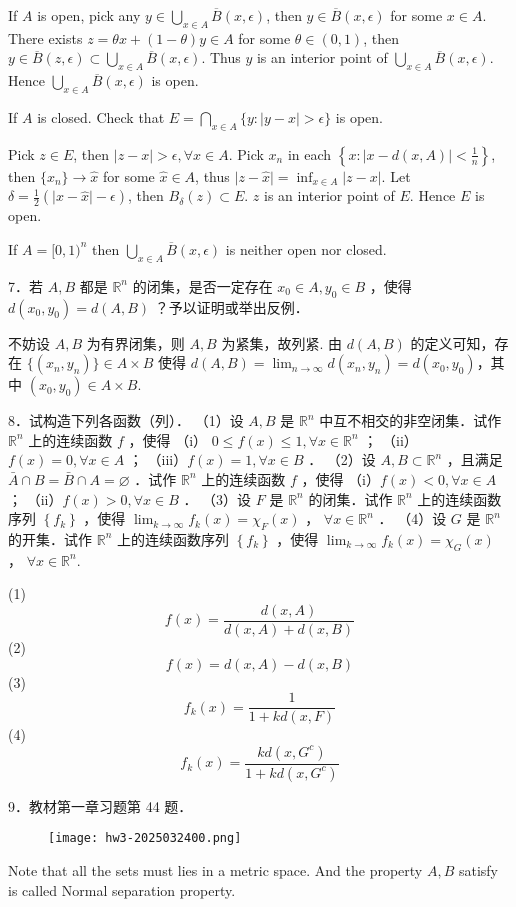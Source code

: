 If $A$ is open, pick any $y\in \bigcup_{x\in A}\overline{B}(x,\epsilon)$, then $y\in \overline{B}(x,\epsilon)$ for some $x\in A$. There exists $z=\theta x+(1-\theta) y\in A$ for some $\theta\in(0,1)$, then $y\in \overline{B}(z,\epsilon)\subset \bigcup_{x\in A}\overline{B}(x,\epsilon)$. Thus $y$ is an interior point of $\bigcup_{x\in A}\overline{B}(x,\epsilon)$. Hence $\bigcup_{x\in A}\overline{B}(x,\epsilon)$ is open.

If $A$ is closed. Check that $E=\bigcap_{x\in A}\{ y:\lvert y-x \rvert>\epsilon \}$ is open.

Pick $z\in E$, then $\lvert z-x \rvert>\epsilon,\forall x\in A$. Pick $x_n$ in each $\left\{  x:\lvert x-d(x,A) \rvert<\frac{1}{n}  \right\}$, then $\{ x_n \}\to \widehat{x}$ for some $\widehat{x}\in A$, thus $\lvert z-\widehat{x} \rvert=\inf_{x\in A}\lvert z-x \rvert$. Let $\delta=\frac{1}{2}(\lvert x-\widehat{x} \rvert-\epsilon)$, then $B_{\delta}(z)\subset E$. $z$ is an interior point of $E$. Hence $E$ is open.

If $A=[0,1)^{n}$ then $\bigcup_{x\in A}\overline{B}(x,\epsilon)$ is neither open nor closed.

\begin{exercise}
7．若 $A, B$ 都是 $\mathbb{R}^n$ 的闭集，是否一定存在 $x_0 \in A, y_0 \in B$ ，使得 $d\left(x_0, y_0\right)=d(A, B)$ ？予以证明或举出反例．
\end{exercise}
不妨设 $A,B$ 为有界闭集，则 $A,B$ 为紧集，故列紧. 由 $d(A,B)$ 的定义可知，存在 $\{ (x_n, y_n) \}\in A\times B$ 使得 $d(A,B)=\lim_{ n \to \infty }d(x_n,y_n)=d(x_0,y_0)$，其中 $(x_0, y_0)\in A\times B$.

\begin{exercise}
8．试构造下列各函数（列）．
（1）设 $A, B$ 是 $\mathbb{R}^n$ 中互不相交的非空闭集．试作 $\mathbb{R}^n$ 上的连续函数 $f$ ，使得
（i） $0 \leqslant f(x) \leqslant 1, \forall x \in \mathbb{R}^n$ ；
（ii）$f(x)=0, \forall x \in A$ ；
（iii）$f(x)=1, \forall x \in B$ ．
（2）设 $A, B \subset \mathbb{R}^n$ ，且满足 $\bar{A} \cap B=\bar{B} \cap A=\varnothing$ ．试作 $\mathbb{R}^n$ 上的连续函数 $f$ ，使得
（i）$f(x)<0, \forall x \in A$ ；
（ii）$f(x)>0, \forall x \in B$ ．
（3）设 $F$ 是 $\mathbb{R}^n$ 的闭集．试作 $\mathbb{R}^n$ 上的连续函数序列 $\left\{f_k\right\}$ ，使得 $\lim _{k \rightarrow \infty} f_k(x)=\chi_F(x)$ ， $\forall x \in \mathbb{R}^n$ ．
（4）设 $G$ 是 $\mathbb{R}^n$ 的开集．试作 $\mathbb{R}^n$ 上的连续函数序列 $\left\{f_k\right\}$ ，使得 $\lim _{k \rightarrow \infty} f_k(x)=\chi_G(x)$ ， $\forall x \in \mathbb{R}^n$.
\end{exercise}
(1)
\[
f(x)=\frac{d(x,A)}{d(x,A)+d(x,B)}
\]
(2)
\[
f(x)=d(x,A)-d(x,B)
\]
(3)
\[
f_k(x)=\frac{1}{1+kd(x,F)}
\]
(4)
\[
f_k(x)=\frac{kd(x,G^{c})}{1+kd(x,G^{c})}
\]
\begin{exercise}
9．教材第一章习题第 44 题．
\begin{figure}[H]
\centering
\texttt{[image: hw3-2025032400.png]}
\label{}
\end{figure}
\end{exercise}
Note that all the sets must lies in a metric space. And the property $A,B$ satisfy is called Normal separation property.

